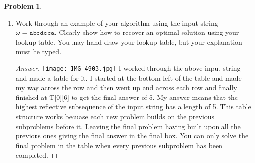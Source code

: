 \documentclass[11pt]{article}
\theoremstyle{definition}
\theoremstyle{definition}
\newtheorem{required}{Problem}
\theoremstyle{definition}
\begin{document}
\begin{required}
\begin{enumerate}[label=(\alph*)]
\begin{proof}[Answer]
 Otherwise, we set:
– T[i][j].length=T[i][j−1].length 

\

The table gives us the max length of our highest reflective subsequence at T[0][n-1]. No pointers are neccessary with this lookup table to find the length of our subsequence. 
\end{proof}



\newpage
\subsection{Problem 2\ref{2c}}
\item \label{2c} Work through an example of your algorithm using the input string $\omega = \texttt{abcdeca}$. Clearly show how to recover an optimal solution using your lookup table. You may hand-draw your lookup table, but your explanation must be typed.

\begin{proof}[Answer]
\texttt{[image: IMG-4903.jpg]}
I worked through the above input string and made a table for it. I started at the bottom left of the table and made my way across the row and then went up and across each row and finally finished at T[0][6] to get the final answer of 5. My answer means that the highest reflective subsequence of the input string has a length of 5. This table structure works becuase each new problem builds on the previous subproblems before it. Leaving the final problem having built upon all the previous ones giving the final answer in the final box. You can only solve the final problem in the table when every previous subproblem has been completed. 
\end{proof}

\end{enumerate}



\end{required}
\end{document}
